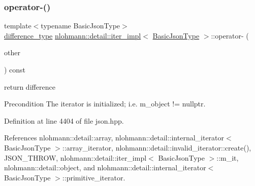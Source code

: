 \subsubsection{\texorpdfstring{operator-\/()}{operator-()}\hspace{0.1cm}{\footnotesize\ttfamily [2/2]}}
{\footnotesize\ttfamily template$<$typename Basic\+Json\+Type$>$ \\
\hyperlink{classnlohmann_1_1detail_1_1iter__impl_a2f7ea9f7022850809c60fc3263775840}{difference\+\_\+type} \hyperlink{classnlohmann_1_1detail_1_1iter__impl}{nlohmann\+::detail\+::iter\+\_\+impl}$<$ \hyperlink{classnlohmann_1_1detail_1_1iter__impl_abf18f18793f84b0222aebb5a2a87da7a}{Basic\+Json\+Type} $>$\+::operator-\/ (\begin{DoxyParamCaption}\item[{const \hyperlink{classnlohmann_1_1detail_1_1iter__impl}{iter\+\_\+impl}$<$ \hyperlink{classnlohmann_1_1detail_1_1iter__impl_abf18f18793f84b0222aebb5a2a87da7a}{Basic\+Json\+Type} $>$ \&}]{other }\end{DoxyParamCaption}) const\hspace{0.3cm}{\ttfamily [inline]}}



return difference 

\begin{DoxyPrecond}{Precondition}
The iterator is initialized; i.\+e. {\ttfamily m\+\_\+object != nullptr}. 
\end{DoxyPrecond}


Definition at line 4404 of file json.\+hpp.



References nlohmann\+::detail\+::array, nlohmann\+::detail\+::internal\+\_\+iterator$<$ Basic\+Json\+Type $>$\+::array\+\_\+iterator, nlohmann\+::detail\+::invalid\+\_\+iterator\+::create(), J\+S\+O\+N\+\_\+\+T\+H\+R\+OW, nlohmann\+::detail\+::iter\+\_\+impl$<$ Basic\+Json\+Type $>$\+::m\+\_\+it, nlohmann\+::detail\+::object, and nlohmann\+::detail\+::internal\+\_\+iterator$<$ Basic\+Json\+Type $>$\+::primitive\+\_\+iterator.


